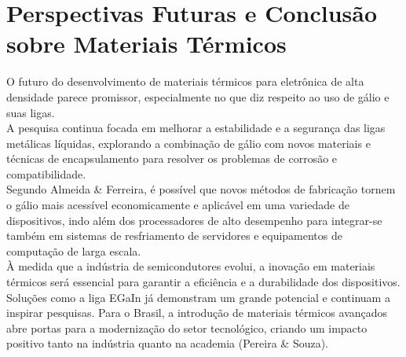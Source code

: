 \documentclass[12pt]{article}
\begin{document}
\section{Perspectivas Futuras e Conclusão sobre Materiais Térmicos}
O futuro do desenvolvimento de materiais térmicos para eletrônica de alta densidade parece promissor, especialmente no que diz respeito ao uso de gálio e suas ligas. \\
A pesquisa continua focada em melhorar a estabilidade e a segurança das ligas metálicas líquidas, explorando a combinação de gálio com novos materiais e técnicas de encapsulamento para resolver os problemas de corrosão e compatibilidade. \\
Segundo Almeida \& Ferreira, é possível que novos métodos de fabricação tornem o gálio mais acessível economicamente e aplicável em uma variedade de dispositivos, indo além dos processadores de alto desempenho para integrar-se também em sistemas de resfriamento de servidores e equipamentos de computação de larga escala.\\
À medida que a indústria de semicondutores evolui, a inovação em materiais térmicos será essencial para garantir a eficiência e a durabilidade dos dispositivos. Soluções como a liga EGaIn já demonstram um grande potencial e continuam a inspirar pesquisas. Para o Brasil, a introdução de materiais térmicos avançados abre portas para a modernização do setor tecnológico, criando um impacto positivo tanto na indústria quanto na academia (Pereira \& Souza).\\
\newpage
\printbibliography
\end{document}
